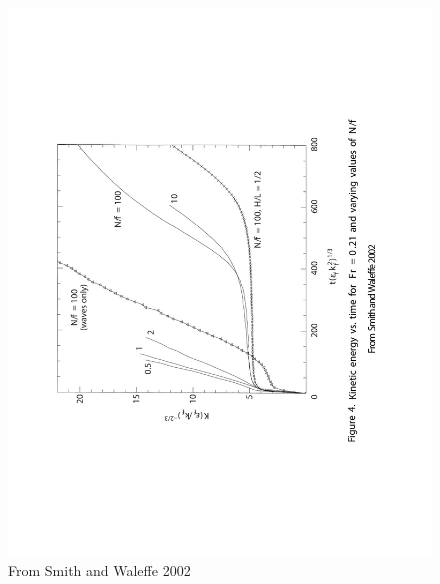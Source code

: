 \documentclass[12pt]{article}
\begin{document}
\begin{figure}
\begin{center}
\includegraphics[angle=-90,width=6.in]{SW02Fig4}
\caption{From Smith and Waleffe 2002}
\label{fig:SW02Fig4}
\end{center}
\end{figure}
\end{document}
